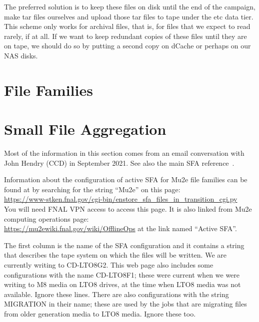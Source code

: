 The preferred solution is to keep these files on disk until the end of the campaign,
make tar files ourselves
and upload those tar files to tape under the etc data tier.
This scheme only works for archival files, that is, for files that we expect to
read rarely, if at all.
If we want to keep redundant copies of these files until they are on tape,
we should do so by putting a second copy on dCache or perhaps on our NAS disks.

\section{File Families}
\label{sec:FileFamilies}

\section{Small File Aggregation}
\label{sec:sfa}

Most of the information in this section comes from an email conversation with
John Hendry (CCD) in September 2021.  See also the main SFA reference~\cite{SFA}.

Information about the configuration of active SFA for Mu2e file families can
be found at by searching for the string ``Mu2e'' on this page: \\
\hphantom{mm}
\href{https://www-stken.fnal.gov/cgi-bin/enstore\_sfa\_files\_in\_transition\_cgi.py}
     {https://www-stken.fnal.gov/cgi-bin/enstore\_sfa\_files\_in\_transition\_cgi.py}\\
You will need FNAL VPN access to access this page.
It is also linked from Mu2e computing operations page: \\
\hphantom{mm}
\href{https://mu2ewiki.fnal.gov/wiki/OfflineOps}{https://mu2ewiki.fnal.gov/wiki/OfflineOps}
at the link named ``Active SFA''.

The first column is the name of the SFA configuration and it contains a string that describes
the tape system on which the files will be written. We are currently writing to CD-LTO8G2.
This web page also includes some configurations with the name CD-LTO8F1; these were current
when we were writing to M8 media on LTO8 drives, at the time when LTO8 media was
not available.  Ignore these lines.  There are also configurations with the string
MIGRATION in their name; these are used by the jobs that are migrating files from older
generation media to LTO8 media. Ignore these too.

